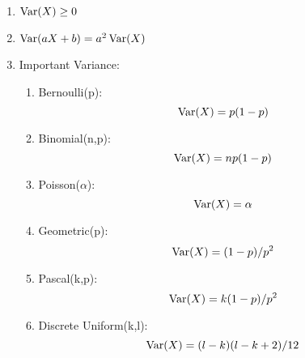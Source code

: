 \begin{enumerate}
{\begin{enumerate}
{\begin{align*}
                    &= \E{(X-\mu_x)^2} \\
                    &= \E{X^2-2\mu_xX+\mu_x^2} \\
                    &= \E{X^2}-2\mu_x\E{X}+\E{\mu_x^2} \\
                    &= \E{X^2}-2\mu_x^2+\mu_x^2 \\
                    &= \E{X^2}-\mu_x^2
                \end{align*}
            }
            \item $\mathop{\mathrm{Var}}\nolimits(X)\geq 0$
            \item $\mathop{\mathrm{Var}}\nolimits(aX+b)=a^2\mathop{\mathrm{Var}}\nolimits(X)$
            \item Important Variance:{
                \begin{enumerate}
                    \item Bernoulli(p): \[\mathop{\mathrm{Var}}\nolimits(X)=p(1-p)\]
                    \item Binomial(n,p): \[\mathop{\mathrm{Var}}\nolimits(X)=np(1-p)\]
                    \item Poisson($\alpha$): \[\mathop{\mathrm{Var}}\nolimits(X)=\alpha\]
                    \item Geometric(p): \[\mathop{\mathrm{Var}}\nolimits(X)=(1-p)/p^2\]
                    \item Pascal(k,p): \[\mathop{\mathrm{Var}}\nolimits(X)=k(1-p)/p^2\]
                    \item Discrete Uniform(k,l): \[\mathop{\mathrm{Var}}\nolimits(X)=(l-k)(l-k+2)/12\]
                \end{enumerate}
            }
        \end{enumerate}
    }
\end{enumerate}